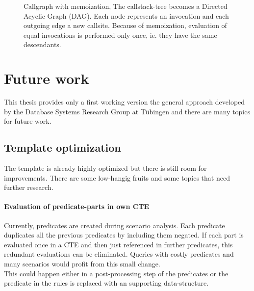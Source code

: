 

\begin{figure}
    \centering
    
    \caption{Callgraph with memoization, The callstack-tree becomes a Directed Acyclic Graph (DAG). Each node represents an invocation and each outgoing edge a new callsite. Because of memoization, evaluation of equal invocations is performed only once, ie. they have the same descendants.}
    \label{fig:fib_callstack_memoization}
\end{figure}



\section{Future work}

This thesis provides only a first working version the general approach developed by the Database Systems Research Group at Tübingen and there are many topics for future work.

\subsection{Template optimization}
The template is already highly optimized but there is still room for improvements. There are some low-hangig fruits and some topics that need further research.

\paragraph*{Evaluation of predicate-parts in own CTE}
Currently, predicates are created during scenario analysis. Each predicate duplicates all the previous predicates by including them negated. If each part is evaluated once in a CTE and then just referenced in further predicates, this redundant evaluations can be eliminated. Queries with costly predicates and many scenarios would profit from this small change.\\
This could happen either in a post-processing step of the predicates or the predicate in the rules is replaced with an supporting data-structure.

